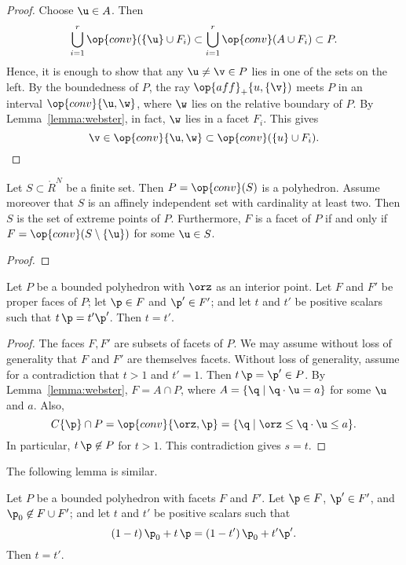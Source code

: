 \begin{proof}
Choose $\u\in A$.   Then
\[ 
\bigcup_{i=1}^r \op{conv}(\{\u\}\cup F_i) \subset \bigcup_{i=1}^r \op{conv}(A\cup F_i)\subset P.
\] 
Hence, it is enough to show that any $\u\ne\v\in P$ lies in one of the sets on the left.
By the boundedness of $P$, the ray $\op{aff}_+\{u,\{\v\})$ meets $P$ in an interval
$\op{conv}\{\u,\w\}$, where $\w$ lies on the relative boundary of $P$.  By Lemma~\ref{lemma:webster}, in fact, $\w$ lies in a facet $F_i$.  This gives
\[ 
 \v\in \op{conv}\{\u,\w\}\subset \op{conv}(\{u\}\cup F_i).
\] 
\end{proof}


\begin{lemma}[]\label{lemma:simplex-poly}
  Let $S\subset\ring{R}^N$ be a finite set.  Then $P=\op{conv}(S)$ is
  a polyhedron.  Assume moreover that $S$ is an affinely independent
  set with cardinality at least two.  Then $S$ is the set of extreme
  points of $P$. Furthermore,   $F$ is a facet of $P$ if and only if $F =
  \op{conv}(S\setminus \{\u\})$ for some $\u\in S$.
\end{lemma}

\begin{proof}
\end{proof}

\begin{lemma}[]\cutrate{} \label{lemma:scale} 
Let $P$ be a bounded polyhedron with $\orz$ as an interior point.
Let $F$ and $F'$ be proper faces of $P$; let $\p\in F$ and
$\p'\in F'$; and let  $t$ and $t'$ be  positive scalars such that $t\, \p = t' \p'$.
Then $t=t'$.
\end{lemma}

\begin{proof} The faces $F,F'$ are subsets of facets of $P$.  We may assume
without loss of generality that $F$ and $F'$ are themselves facets.  Without
loss of generality, assume for a contradiction that $t>1$ and $t'=1$.
Then $t\, \p = \p'\in P$.
By Lemma~\ref{lemma:webster}, $F = A \cap P$, where $A= \{\q
\mid \q\cdot \u = a\}$ for some $\u$ and $a$.  Also,
\[ 
C\{\p\}\cap P = \op{conv}\{\orz,\p\} = \{\q \mid \orz\le \q\cdot \u \le a\}.
\] 
In particular, $t\, \p\not\in P$ for $t>1$.  This contradiction gives
$s = t$.
\end{proof}

The following lemma is similar.

\begin{lemma}[]\cutrate{} \label{lemma:scale2} 
Let $P$ be a bounded polyhedron with facets $F$ and $F'$.
Let $\p\in F$,
$\p'\in F'$, 
and $\p_0\not\in F\cup F'$; and let  $t$ and $t'$ be  positive scalars such that 
\[
(1-t)\, \p_0 + t\, \p = (1-t')\, \p_0 + t' \p'.
\]
Then $t=t'$.
\end{lemma}


